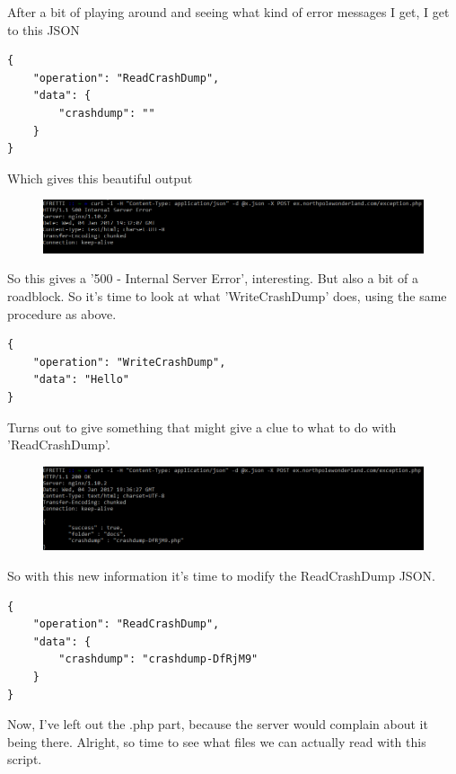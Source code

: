 \documentclass[writeup.tex]{subfiles}
\begin{document}
			After a bit of playing around and seeing what kind of error messages I get, I get to this JSON
			\begin{lstlisting}[columns=fullflexible,breaklines]
{
	"operation": "ReadCrashDump",
	"data": {
		"crashdump": ""
	}
}
			\end{lstlisting}
			
			Which gives this beautiful output
			
			\begin{figure}[H]
				\centering
				\includegraphics[width=\linewidth]{"screenshots/pwns/Site 5 - curl 4"}
			\end{figure}
			
			So this gives a '500 - Internal Server Error', interesting. But also a bit of a roadblock. So it's time to look at what 'WriteCrashDump' does, using the same procedure as above.
			
			\begin{lstlisting}[columns=fullflexible,breaklines]
{
	"operation": "WriteCrashDump",
	"data": "Hello"
}
			\end{lstlisting}
			
			Turns out to give something that might give a clue to what to do with 'ReadCrashDump'.
			
			\begin{figure}[H]
				\centering
				\includegraphics[width=\linewidth]{"screenshots/pwns/Site 5 - curl 5"}
			\end{figure}
			
			So with this new information it's time to modify the ReadCrashDump JSON.
			
			\begin{lstlisting}[columns=fullflexible,breaklines]
{
	"operation": "ReadCrashDump",
	"data": {
		"crashdump": "crashdump-DfRjM9"
	}
}
			\end{lstlisting}
			
			Now, I've left out the .php part, because the server would complain about it being there. Alright, so time to see what files we can actually read with this script.
			
\end{document}
